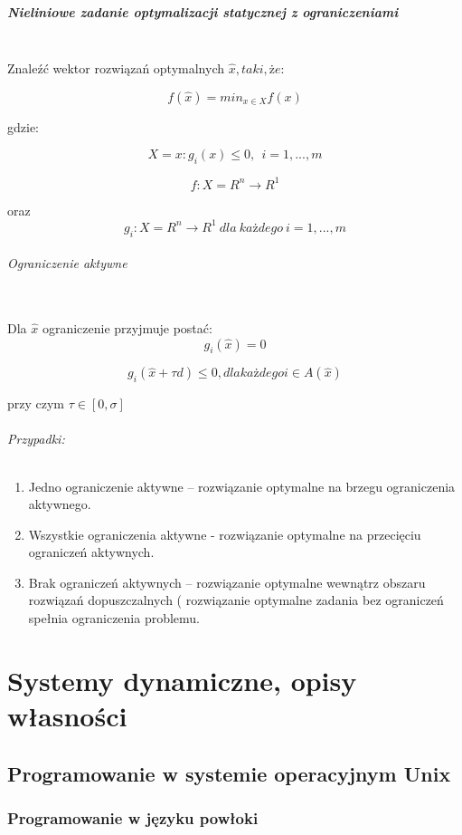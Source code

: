 \documentclass[]{report}
\begin{document}
\paragraph{Nieliniowe zadanie optymalizacji statycznej z ograniczeniami\\\\}
Znaleźć wektor rozwiązań optymalnych $\hat{x}, taki, że:$

$$f(\hat{x})=min_{x \in X}f(x)$$

gdzie:

$$X={x:g_i(x) \le 0,~~i=1,...,m}$$

$$f:X = R^n \longrightarrow R^1$$

oraz $$g_i:X = R^n \longrightarrow R^1~dla~każdego~i=1,...,m$$

\subparagraph{Ograniczenie aktywne\\\\}

Dla $\hat{x}$ ograniczenie przyjmuje postać:
\[  g_i(\hat{x})=0 \]


$$ g_i(\hat{x}+\tau d) \le 0, dla każdego i \in A(\hat{x})$$

przy czym $\tau \in [0,\sigma]$



\subparagraph{Przypadki:}

\begin{enumerate}

\item Jedno ograniczenie aktywne – rozwiązanie optymalne na brzegu ograniczenia
aktywnego.
\item Wszystkie ograniczenia aktywne - rozwiązanie optymalne na przecięciu ograniczeń
aktywnych.
\item Brak ograniczeń aktywnych – rozwiązanie optymalne wewnątrz obszaru rozwiązań
dopuszczalnych ( rozwiązanie optymalne zadania bez ograniczeń spełnia
ograniczenia problemu.

\end{enumerate}

\chapter{Systemy dynamiczne, opisy własności}
\section{Programowanie w systemie operacyjnym Unix}
\subsection{Programowanie w języku powłoki}
\end{document}
